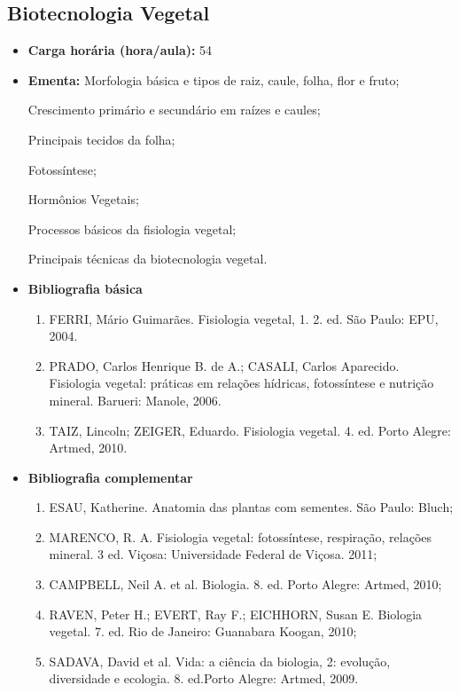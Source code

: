 \documentclass[11pt,fleqn]{book} %
\begin{document}
\subsection{Biotecnologia Vegetal}\label{disc:biotecVegetal}
\begin{itemize}
	\item \textbf{Carga horária (hora/aula):} 54
	\item \textbf{Ementa:}	
	Morfologia básica e tipos de raiz, caule, folha, flor e fruto; 
	
	Crescimento primário e secundário em raízes e caules; 
	
	Principais tecidos da folha;	

	Fotossíntese; 
	
	Hormônios Vegetais; 
	
	Processos básicos da fisiologia vegetal; 
	
	Principais técnicas da biotecnologia vegetal.
	\item \textbf{Bibliografia básica}
	\begin{enumerate}
		\item FERRI, Mário Guimarães. Fisiologia vegetal, 1. 2. ed. São Paulo: EPU, 2004. 
		\item PRADO, Carlos Henrique B. de A.; CASALI, Carlos Aparecido.  Fisiologia vegetal: práticas em relações hídricas, fotossíntese e nutrição mineral. Barueri: Manole, 2006.
		\item TAIZ, Lincoln; ZEIGER, Eduardo. Fisiologia vegetal. 4. ed. Porto Alegre: Artmed, 2010.
	\end{enumerate}
	\item \textbf{Bibliografia complementar}
	\begin{enumerate}
		\item ESAU, Katherine. Anatomia das plantas com sementes. São Paulo: Bluch;
		\item MARENCO, R. A. Fisiologia vegetal: fotossíntese, respiração, relações mineral. 3 ed. Viçosa: Universidade Federal de Viçosa. 2011;
		\item CAMPBELL, Neil A. et al. Biologia. 8. ed. Porto Alegre: Artmed, 2010;
		\item RAVEN, Peter H.; EVERT, Ray F.; EICHHORN, Susan E. Biologia vegetal. 7. ed. Rio de Janeiro: Guanabara Koogan, 2010;
		\item SADAVA, David et al. Vida: a ciência da biologia, 2: evolução, diversidade e ecologia. 8. ed.Porto Alegre: Artmed, 2009.
	\end{enumerate}	
\end{itemize}
\end{document}
